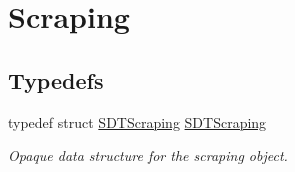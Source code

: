 \hypertarget{group__scraping}{}\section{Scraping}
\label{group__scraping}
\subsection*{Typedefs}
\begin{DoxyCompactItemize}
\item 
\hypertarget{group__scraping_ga31635c2bb9b5bed7af5e675ad89f1bde}{}typedef struct \hyperlink{group__scraping_ga31635c2bb9b5bed7af5e675ad89f1bde}{S\+D\+T\+Scraping} \hyperlink{group__scraping_ga31635c2bb9b5bed7af5e675ad89f1bde}{S\+D\+T\+Scraping}\label{group__scraping_ga31635c2bb9b5bed7af5e675ad89f1bde}

\begin{DoxyCompactList}\small\item\em Opaque data structure for the scraping object. \end{DoxyCompactList}\end{DoxyCompactItemize}
